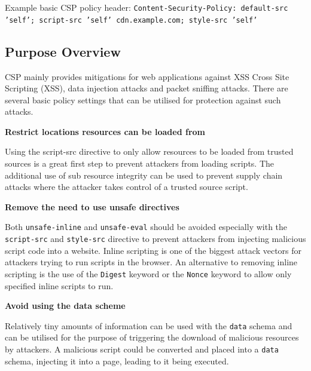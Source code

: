 \documentclass{mscreport}
\begin{document}
\vspace{0.5cm} \noindent
Example basic CSP policy header: \texttt{Content-Security-Policy: default-src 'self'; script-src 'self' cdn.example.com; style-src 'self'}

\subsection{Purpose Overview}

CSP mainly provides mitigations for web applications against XSS Cross Site Scripting (XSS), data injection attacks and packet sniffing attacks. There are several basic policy settings that can be utilised for protection against such attacks.

\vspace{0.5cm} \noindent
\textbf{Restrict locations resources can be loaded from}

\vspace{0.3cm} \noindent
Using the script-src directive to only allow resources to be loaded from trusted sources is a great first step to prevent attackers from loading scripts. The additional use of sub resource integrity can be used to prevent supply chain attacks where the attacker takes control of a trusted source script.

\vspace{0.5cm} \noindent
\textbf{Remove the need to use unsafe directives}

\vspace{0.3cm} \noindent
Both \texttt{unsafe-inline} and \texttt{unsafe-eval} should be avoided especially with the  \texttt{script-src} and \texttt{style-src} directive to prevent attackers from injecting malicious script code into a website. Inline scripting is one of the biggest attack vectors for attackers trying to run scripts in the browser. An alternative to removing inline scripting is the use of the \texttt{Digest} keyword or the \texttt{Nonce} keyword to allow only specified inline scripts to run.

\vspace{0.5cm} \noindent
\textbf{Avoid using the data scheme}

\vspace{0.3cm} \noindent
Relatively tiny amounts of information can be used with the \texttt{data} schema and can be utilised for the purpose of triggering the download of malicious resources by attackers. A malicious script could be converted and placed into a \texttt{data} schema, injecting it into a page, leading to it being executed.
\end{document}
